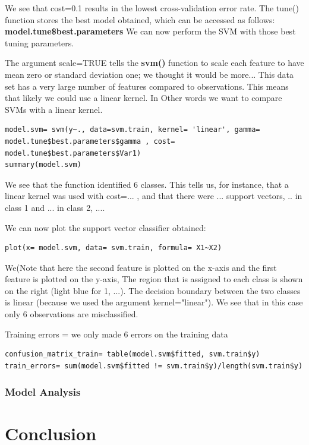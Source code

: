 \documentclass[]{report}
\begin{document}
We see that cost=0.1 results in the lowest cross-validation error rate. 
The tune() function stores the best model obtained, which can be accessed as follows: \textbf{model.tune\$best.parameters} We can now perform the SVM with those best tuning parameters.

The argument scale=TRUE tells the \textbf{svm()} function to scale each feature to have mean zero or standard deviation one; we thought it would be more...
This data set has a very large number of features compared to observations. This means that likely we could use a linear kernel. In Other words we want to compare SVMs with a linear kernel.

\begin{lstlisting}
model.svm= svm(y~., data=svm.train, kernel= 'linear', gamma= model.tune$best.parameters$gamma , cost= model.tune$best.parameters$Var1)
summary(model.svm) 
\end{lstlisting}
We see that the function identified 6 classes. This tells us, for instance, that a linear kernel was used with cost=... , 
and that there were ... support vectors, .. in class 1 and ... in class 2, ....

We can now plot the support vector classifier obtained:

\begin{lstlisting}
plot(x= model.svm, data= svm.train, formula= X1~X2)
\end{lstlisting}

We(Note that here the second feature is plotted on the x-axis and the first feature is plotted on the y-axis, 
The region that is assigned to each class is shown on the right (light blue for 1, ...). The decision boundary between the two classes is linear 
(because we used the argument kernel="linear"). 
We see that in this case only 6 observations are misclassified. 

Training errors = we only made 6 errors on the training data
\begin{lstlisting}
confusion_matrix_train= table(model.svm$fitted, svm.train$y)
train_errors= sum(model.svm$fitted != svm.train$y)/length(svm.train$y)
\end{lstlisting}

\subsubsection{Model Analysis}


\section{Conclusion}
\end{document}
